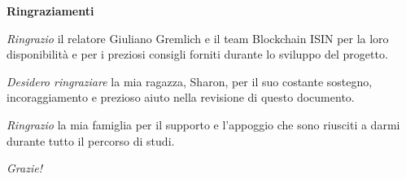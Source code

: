 \begin{center}
    \vspace*{\fill}
    \raggedleft

    \begin{minipage}{0.63\textwidth} %
    \raggedleft
    \textbf{Ringraziamenti}

    \vspace{1em}

    \textit{Ringrazio} il relatore Giuliano Gremlich e il team Blockchain ISIN per la loro disponibilità e per i preziosi consigli forniti durante lo sviluppo del progetto. 
    
    \vspace{1em}
    
    \textit{Desidero ringraziare} la mia ragazza, Sharon, per il suo costante sostegno, incoraggiamento e prezioso aiuto nella revisione di questo documento.

    \vspace{1em}

    \textit{Ringrazio} la mia famiglia per il supporto e l'appoggio che sono riusciti a darmi durante tutto il percorso di studi.

    \vspace{1em}

    \textit{Grazie!}

    \end{minipage}
    \vspace*{\fill}
\end{center}

